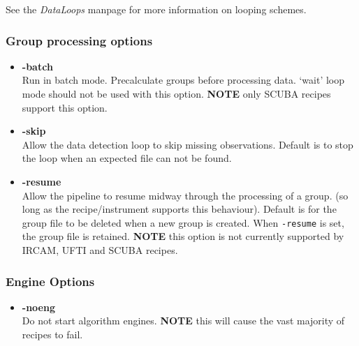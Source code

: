 \documentclass[twoside,11pt]{article}
\renewcommand{\_}{\texttt{\symbol{95}}}
\def\C++{{\rm C\kern-.05em\raise.3ex\hbox{\footnotesize ++}}}
\newcommand{\underscore}{\_}
\begin{document}
See the {\em DataLoops\/} manpage for more
information on looping schemes.

\subsubsection*{Group processing options}

\begin{itemize}

\item{\bf -batch}
\hfil\\
Run in batch mode. Precalculate groups before processing
data. `wait' loop mode should not be used with this option.
{\bf NOTE} only SCUBA recipes support this option.

\item{\bf -skip}
\hfil\\
Allow the data detection loop to skip missing observations.
Default is to stop the loop when an expected file can not be found.

\item{\bf -resume}
\hfil\\
Allow the pipeline to resume midway through the processing
of a group. (so long as the recipe/instrument supports
this behaviour). Default is for the group file to be deleted
when a new group is created. When {\tt -resume} is set, the group
file is retained. {\bf NOTE} this option is not currently supported by
IRCAM, UFTI and SCUBA recipes.

\end{itemize}

\subsubsection*{Engine Options}

\begin{itemize}

\item{\bf -noeng}
\hfil\\
Do not start algorithm engines. {\bf NOTE} this will cause
the vast majority of recipes to fail.

\end{itemize}


\end{document}
